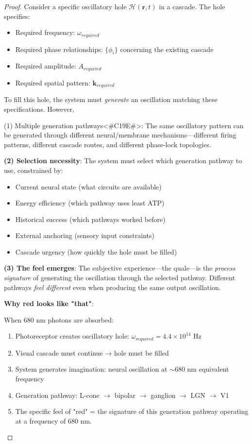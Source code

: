 \documentclass[11pt,a4paper]{article}
\begin{document}
\begin{proof}
Consider a specific oscillatory hole $\mathcal{H}(\mathbf{r}, t)$ in a cascade. The hole specifies:
\begin{itemize}
\item Required frequency: $\omega_{required}$
\item Required phase relationships: $\{\phi_i\}$ concerning the existing cascade
\item Required amplitude: $A_{required}$
\item Required spatial pattern: $\mathbf{k}_{required}$
\end{itemize}

To fill this hole, the system must \textit{generate} an oscillation matching these specifications. However,

(1) Multiple generation pathways<#C19E#>: The same oscillatory pattern can be generated through different neural/membrane mechanisms—different firing patterns, different cascade routes, and different phase-lock topologies.

\textbf{(2) Selection necessity}: The system must select which generation pathway to use, constrained by:
\begin{itemize}
\item Current neural state (what circuits are available)
\item Energy efficiency (which pathway uses least ATP)
\item Historical success (which pathways worked before)
\item External anchoring (sensory input constraints)
\item Cascade urgency (how quickly the hole must be filled)
\end{itemize}

\textbf{(3) The feel emerges}: The subjective experience—the quale—is the \textit{process signature} of generating the oscillation through the selected pathway. Different pathways \textit{feel different} even when producing the same output oscillation.

\textbf{Why red looks like "that"}:

When 680 nm photons are absorbed:
\begin{enumerate}
\item Photoreceptor creates oscillatory hole: $\omega_{required} = 4.4 \times 10^{14}$ Hz
\item Visual cascade must continue → hole must be filled
\item System generates imagination: neural oscillation at $\sim$680 nm equivalent frequency
\item Generation pathway: L-cone $\to$ bipolar $\to$ ganglion $\to$ LGN $\to$ V1
\item The specific feel of "red" = the signature of this generation pathway operating at a frequency of 680 nm.
\end{enumerate}


\end{proof}
\end{document}
